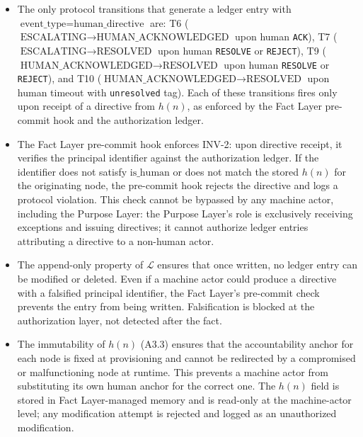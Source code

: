 \begin{itemize}
\item[\textbf{Step 1.}] The only protocol transitions that generate a ledger entry with $\text{event\_type} = \text{human\_directive}$ are: T6 ($\text{ESCALATING} \rightarrow \text{HUMAN\_ACKNOWLEDGED}$ upon human \texttt{ACK}), T7 ($\text{ESCALATING} \rightarrow \text{RESOLVED}$ upon human \texttt{RESOLVE} or \texttt{REJECT}), T9 ($\text{HUMAN\_ACKNOWLEDGED} \rightarrow \text{RESOLVED}$ upon human \texttt{RESOLVE} or \texttt{REJECT}), and T10 ($\text{HUMAN\_ACKNOWLEDGED} \rightarrow \text{RESOLVED}$ upon human timeout with \texttt{unresolved} tag). Each of these transitions fires only upon receipt of a directive from $h(n)$, as enforced by the Fact Layer pre-commit hook and the authorization ledger.

\item[\textbf{Step 2.}] The Fact Layer pre-commit hook enforces INV-2: upon directive receipt, it verifies the principal identifier against the authorization ledger. If the identifier does not satisfy $\text{is\_human}$ or does not match the stored $h(n)$ for the originating node, the pre-commit hook rejects the directive and logs a protocol violation. This check cannot be bypassed by any machine actor, including the Purpose Layer: the Purpose Layer's role is exclusively receiving exceptions and issuing directives; it cannot authorize ledger entries attributing a directive to a non-human actor.

\item[\textbf{Step 3.}] The append-only property of $\mathcal{L}$ ensures that once written, no ledger entry can be modified or deleted. Even if a machine actor could produce a directive with a falsified principal identifier, the Fact Layer's pre-commit check prevents the entry from being written. Falsification is blocked at the authorization layer, not detected after the fact.

\item[\textbf{Step 4.}] The immutability of $h(n)$ (A3.3) ensures that the accountability anchor for each node is fixed at provisioning and cannot be redirected by a compromised or malfunctioning node at runtime. This prevents a machine actor from substituting its own human anchor for the correct one. The $h(n)$ field is stored in Fact Layer-managed memory and is read-only at the machine-actor level; any modification attempt is rejected and logged as an unauthorized modification.
\end{itemize}

